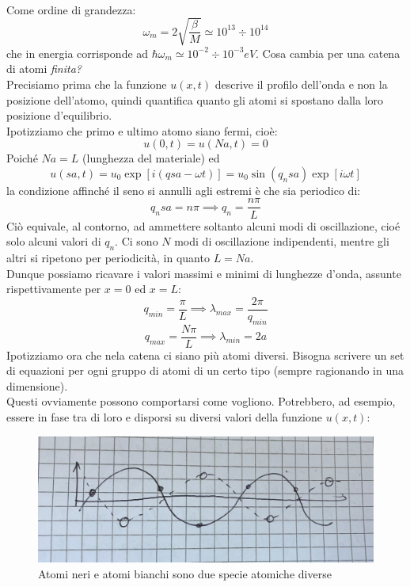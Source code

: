 \documentclass{book}
\begin{document}
        \paragraph{}
            Come ordine di grandezza:
            $$\omega_{m} = 2 \sqrt{\frac{\beta}{M}} \simeq 10^{13} \div 10^{14}$$
            che in energia corrisponde ad $\hbar \omega_{m} \simeq 10^{-2} \div 10^{-3} eV$.
            Cosa cambia per una catena di atomi \textit{finita?}\\
            Precisiamo prima che la funzione $u(x,t)$ descrive il profilo dell'onda e non la posizione dell'atomo, quindi quantifica quanto gli atomi si spostano dalla loro posizione d'equilibrio.\\
            Ipotizziamo che primo e ultimo atomo siano fermi, cioè:
            $$u(0,t) = u(Na,t) = 0$$
            Poiché $Na = L$ (lunghezza del materiale) ed
            $$u(sa,t) = u_{0}\exp{[i(qsa-\omega t)]} = u_{0}\sin{(q_{n}sa)}\exp{[i\omega t]}$$
            la condizione affinché il seno si annulli agli estremi è che sia periodico di: 
            $$q_{n}sa = n \pi \implies q_{n} = \frac{n \pi}{L}$$
            Ciò equivale, al contorno, ad ammettere soltanto alcuni modi di oscillazione, cioé solo alcuni valori di $q_{n}$. Ci sono $N$ modi di oscillazione indipendenti, mentre gli altri si ripetono per periodicità, in quanto $L=Na$.\\
            Dunque possiamo ricavare i valori massimi e minimi di lunghezze d'onda, assunte rispettivamente per $x=0$ ed $x=L$:
            $$q_{min} = \frac{\pi}{L} \implies\lambda_{max} = \frac{2\pi}{q_{min}}$$
            $$q_{max} = \frac{N \pi}{L} \implies \lambda_{min} = 2a$$
            Ipotizziamo  ora che nela catena ci siano più atomi diversi. Bisogna scrivere un set di equazioni per ogni gruppo di atomi di un certo tipo (sempre ragionando in una dimensione).\\
            Questi ovviamente possono comportarsi come vogliono. Potrebbero, ad esempio, essere in fase tra di loro e disporsi su diversi valori della funzione $u(x,t)$:
            \begin{figure}[h!]
                \centering
                \includegraphics[width=0.5\linewidth]{img/imnothere5.png}
                \caption{Atomi neri e atomi bianchi sono due specie atomiche diverse}
            \end{figure} \\
\end{document}
